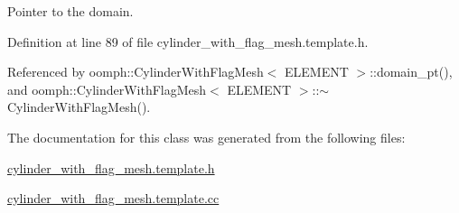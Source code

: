 Pointer to the domain. 



Definition at line 89 of file cylinder\+\_\+with\+\_\+flag\+\_\+mesh.\+template.\+h.



Referenced by oomph\+::\+Cylinder\+With\+Flag\+Mesh$<$ E\+L\+E\+M\+E\+N\+T $>$\+::domain\+\_\+pt(), and oomph\+::\+Cylinder\+With\+Flag\+Mesh$<$ E\+L\+E\+M\+E\+N\+T $>$\+::$\sim$\+Cylinder\+With\+Flag\+Mesh().



The documentation for this class was generated from the following files\+:\begin{DoxyCompactItemize}
\item 
\hyperlink{cylinder__with__flag__mesh_8template_8h}{cylinder\+\_\+with\+\_\+flag\+\_\+mesh.\+template.\+h}\item 
\hyperlink{cylinder__with__flag__mesh_8template_8cc}{cylinder\+\_\+with\+\_\+flag\+\_\+mesh.\+template.\+cc}\end{DoxyCompactItemize}
